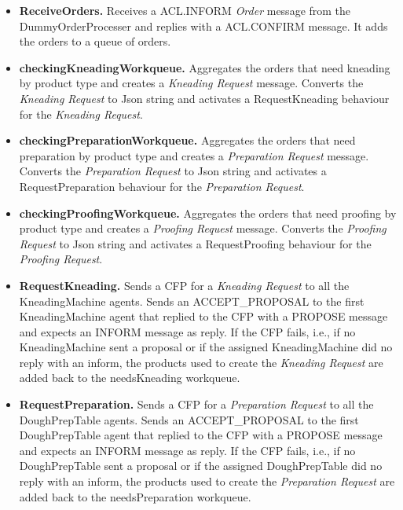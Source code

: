 \documentclass[paper=a4, fontsize=11pt]{scrartcl}
\begin{document}
	\begin{itemize}

		\item \textbf{ReceiveOrders.} Receives a ACL.INFORM \textit{Order} message from the DummyOrderProcesser and replies with a ACL.CONFIRM message. It adds the orders to a queue of orders.

		\item \textbf{checkingKneadingWorkqueue.} Aggregates the orders that need kneading by product type and creates a \textit{Kneading Request} message. Converts the \textit{Kneading Request} to Json string and activates a RequestKneading behaviour for the \textit{Kneading Request}.

		\item \textbf{checkingPreparationWorkqueue.} Aggregates the orders that need preparation by product type and creates a \textit{Preparation Request} message. Converts the \textit{Preparation Request} to Json string and activates a RequestPreparation behaviour for the \textit{Preparation Request}.

		\item \textbf{checkingProofingWorkqueue.} Aggregates the orders that need proofing by product type and creates a \textit{Proofing Request} message. Converts the \textit{Proofing Request} to Json string and activates a RequestProofing behaviour for the \textit{Proofing Request}.

		\item \textbf{RequestKneading.} Sends a CFP for a \textit{Kneading Request} to all the KneadingMachine agents. Sends an ACCEPT\_PROPOSAL to the first KneadingMachine agent that replied to the CFP with a PROPOSE message and expects an INFORM message as reply. If the CFP fails, i.e., if no KneadingMachine sent a proposal or if the assigned KneadingMachine did no reply with an inform, the products used to create the \textit{Kneading Request} are added back to the needsKneading workqueue.

		\item \textbf{RequestPreparation.} Sends a CFP for a \textit{Preparation Request} to all the DoughPrepTable agents. Sends an ACCEPT\_PROPOSAL to the first DoughPrepTable agent that replied to the CFP with a PROPOSE message and expects an INFORM message as reply. If the CFP fails, i.e., if no DoughPrepTable sent a proposal or if the assigned DoughPrepTable did no reply with an inform, the products used to create the \textit{Preparation Request} are added back to the needsPreparation workqueue.


\end{itemize}
\end{document}
